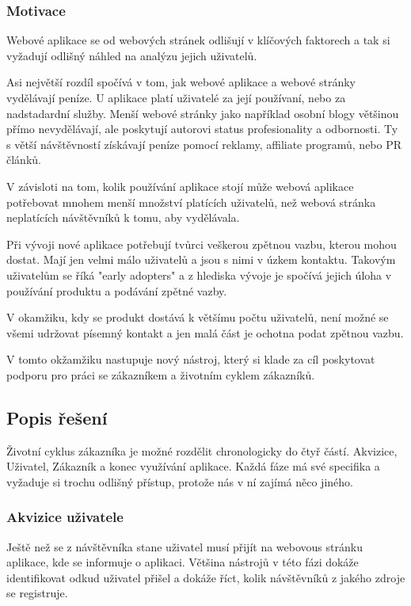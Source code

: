 \documentclass[bc,female,java,dept456]{diploma}						%
\begin{document}
\subsubsection{Motivace}

Webové aplikace se od webových stránek odlišují v klíčových faktorech a tak si vyžadují odlišný náhled na analýzu jejich uživatelů. 

Asi největší rozdíl spočívá v tom, jak webové aplikace a webové stránky vydělávají peníze. U aplikace platí uživatelé za její používaní, nebo za nadstadardní služby. Menší webové stránky jako například osobní blogy většinou přímo nevydělávají, ale poskytují autorovi status profesionality a odbornosti. Ty s větší návštěvností získávají peníze pomocí reklamy, affiliate programů, nebo PR článků.

V závisloti na tom, kolik používání aplikace stojí může webová aplikace potřebovat mnohem menší množství platících uživatelů, než webová stránka neplatících návštěvníků k tomu, aby vydělávala. 

Při vývoji nové aplikace potřebují tvůrci veškerou zpětnou vazbu, kterou mohou dostat. Mají jen velmi málo uživatelů a jsou s nimi v úzkem kontaktu. Takovým uživatelům se říká "early adopters" a z hlediska vývoje je spočívá jejich úloha v používání produktu a podávání zpětné vazby. 

V okamžiku, kdy se produkt dostává k většímu počtu uživatelů, není možné se všemi udržovat písemný kontakt a jen malá část je ochotna podat zpětnou vazbu. 

V tomto okžamžiku nastupuje nový nástroj, který si klade za cíl poskytovat podporu pro práci se zákazníkem a životním cyklem zákazníků.


\subsection{Popis řešení} %

Životní cyklus zákazníka je možné rozdělit chronologicky do čtyř částí. Akvizice, Uživatel, Zákazník a konec využívání aplikace. Každá fáze má své specifika a vyžaduje si trochu odlišný přístup, protože nás v ní zajímá něco jiného.

\subsubsection{Akvizice uživatele}

Ještě než se z návštěvníka stane uživatel musí přijít na webovous stránku aplikace, kde se informuje o aplikaci. Většina nástrojů v této fázi dokáže identifikovat odkud uživatel přišel a dokáže říct, kolik návštěvníků z jakého zdroje se registruje.
\end{document}
